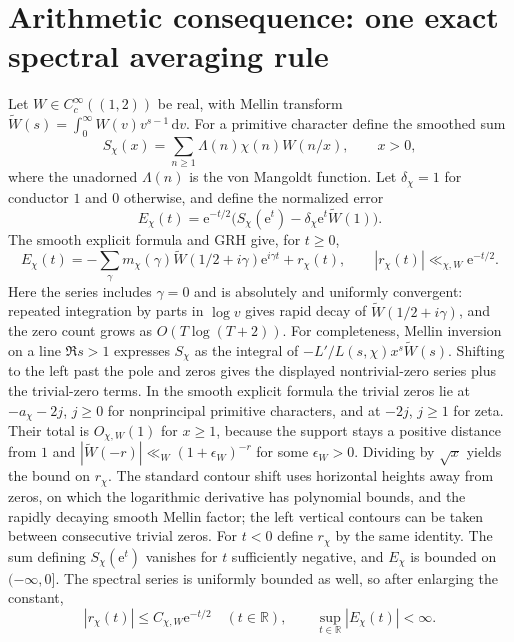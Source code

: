 \documentclass[11pt]{article}
\theoremstyle{remark}\newtheorem{remark}[theorem]{Remark}
\newcommand{\R}{\mathbb R}\newcommand{\C}{\mathbb C}\newcommand{\dd}{\,\mathrm d}
\newcommand{\ee}{\mathrm e}\newcommand{\abs}[1]{\lvert#1\rvert}
\begin{document}
\section{Arithmetic consequence: one exact spectral averaging rule}
\label{sec:arithmetic}
Let $W\in C_c^\infty((1,2))$ be real, with Mellin transform $\widetilde W(s)=\int_0^\infty W(v)v^{s-1}\dd v$. For a primitive character define the smoothed sum
\[
 S_\chi(x)=\sum_{n\ge1}\Lambda(n)\chi(n)W(n/x),\qquad x>0,
\]
where the unadorned $\Lambda(n)$ is the von Mangoldt function. Let $\delta_\chi=1$ for conductor $1$ and $0$ otherwise, and define the normalized error
\[
 E_\chi(t)=\ee^{-t/2}\big(S_\chi(\ee^t)-\delta_\chi\ee^t\widetilde W(1)\big).
\]
The smooth explicit formula \cite{davenport,titchmarsh} and GRH give, for $t\ge0$,
\begin{equation}\label{eq:explicit}
 E_\chi(t)=-\sum_{\gamma}m_\chi(\gamma)\widetilde W(1/2+i\gamma)\ee^{i\gamma t}+r_\chi(t),\qquad
 |r_\chi(t)|\ll_{\chi,W}\ee^{-t/2}.
\end{equation}
Here the series includes $\gamma=0$ and is absolutely and uniformly convergent: repeated integration by parts in $\log v$ gives rapid decay of $\widetilde W(1/2+i\gamma)$, and the zero count grows as $O(T\log(T+2))$. For completeness, Mellin inversion on a line $\Re s>1$ expresses $S_\chi$ as the integral of $-L'/L(s,\chi)x^s\widetilde W(s)$. Shifting to the left past the pole and zeros gives the displayed nontrivial-zero series plus the trivial-zero terms. In the smooth explicit formula the trivial zeros lie at $-a_\chi-2j$, $j\ge0$ for nonprincipal primitive characters, and at $-2j$, $j\ge1$ for zeta. Their total is $O_{\chi,W}(1)$ for $x\ge1$, because the support stays a positive distance from $1$ and $|\widetilde W(-r)|\ll_W (1+\epsilon_W)^{-r}$ for some $\epsilon_W>0$. Dividing by $\sqrt x$ yields the bound on $r_\chi$. The standard contour shift uses horizontal heights away from zeros, on which the logarithmic derivative has polynomial bounds, and the rapidly decaying smooth Mellin factor; the left vertical contours can be taken between consecutive trivial zeros. For $t<0$ define $r_\chi$ by the same identity. The sum defining $S_\chi(\ee^t)$ vanishes for $t$ sufficiently negative, and $E_\chi$ is bounded on $(-\infty,0]$. The spectral series is uniformly bounded as well, so after enlarging the constant,
\begin{equation}\label{eq:globalr}
 |r_\chi(t)|\le C_{\chi,W}\ee^{-t/2}\quad(t\in\R),\qquad \sup_{t\in\R}|E_\chi(t)|<\infty.
\end{equation}
\end{document}
